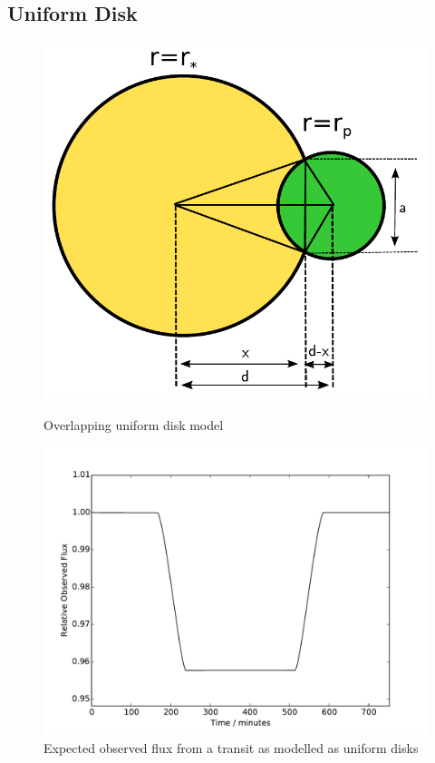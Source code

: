 \subsection{Uniform Disk}
\begin{figure}[\here]
    \centering
    \begin{minipage}[b]{\figwidth}
        \includegraphics[width=\textwidth]{images/uniform_disk_overlap.pdf}
        \caption{Overlapping uniform disk model}
        \label{fig:uniform_overlap}
    \end{minipage}\quad\quad
    \begin{minipage}[b]{\figwidth}
        \includegraphics[width=\textwidth]{images/uniform_disk_model.pdf}
        \caption{Expected observed flux from a transit as modelled as uniform disks}
        \label{fig:uniform_disk_model}
        \end{minipage}
\end{figure}

